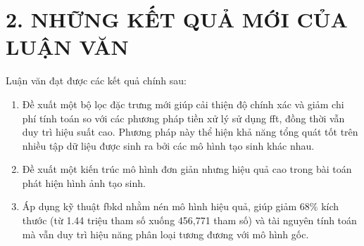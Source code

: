 \section*{2. NHỮNG KẾT QUẢ MỚI CỦA LUẬN VĂN}
Luận văn đạt được các kết quả chính sau:

\begin{enumerate}
	\item Đề xuất một bộ lọc đặc trưng mới giúp cải thiện độ chính xác và giảm chi phí tính toán so với các phương pháp tiền xử lý sử dụng \gls{fft}, đồng thời vẫn duy trì hiệu suất cao. Phương pháp này thể hiện khả năng tổng quát tốt trên nhiều tập dữ liệu được sinh ra bởi các mô hình tạo sinh khác nhau.


	\item Đề xuất một kiến trúc mô hình đơn giản nhưng hiệu quả cao trong bài toán phát hiện hình ảnh tạo sinh.
	
	\item Áp dụng kỹ thuật \gls{fbkd} nhằm nén mô hình hiệu quả, giúp giảm 68\% kích thước (từ 1.44 triệu tham số xuống 456,771 tham số) và tài nguyên tính toán mà vẫn duy trì hiệu năng phân loại tương đương với mô hình gốc.
	
\end{enumerate}














